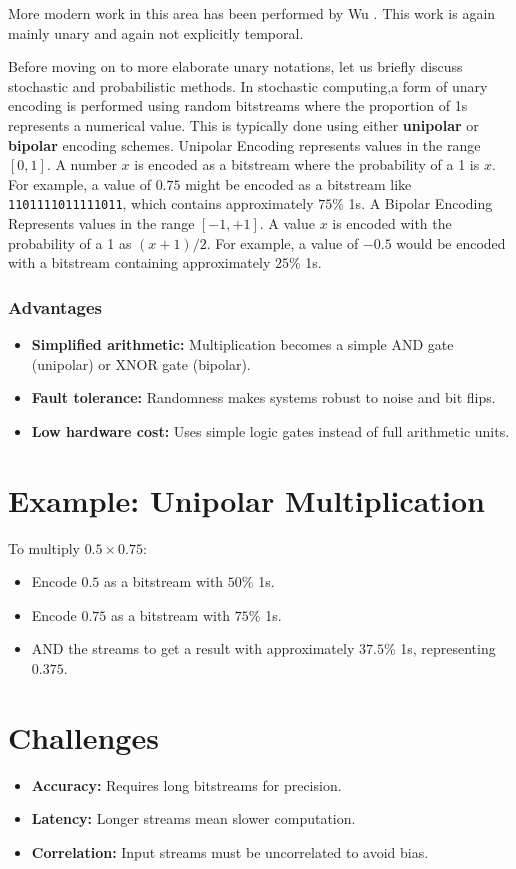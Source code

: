\documentclass{article}
\begin{document}
More modern work in this area has been performed by Wu \cite{wu2020ugemm} \cite{pan2022t} \cite{wu2022usystolic}. This work is again mainly unary and again not explicitly temporal.

Before moving on to more elaborate unary notations, let us briefly discuss stochastic and probabilistic methods. In stochastic computing,a form of unary encoding is performed using random bitstreams where the proportion of 1s represents a numerical value. This is typically done using either \textbf{unipolar} or \textbf{bipolar} encoding schemes.
Unipolar Encoding represents values in the range $[0, 1]$. A number $x$ is encoded as a bitstream where the probability of a 1 is $x$. For example, a value of $0.75$ might be encoded as a bitstream like \texttt{1101111011111011}, which contains approximately $75\%$ 1s. A Bipolar Encoding Represents values in the range $[-1, +1]$. A value $x$ is encoded with the probability of a 1 as $(x + 1)/2$. For example, a value of $-0.5$ would be encoded with a bitstream containing approximately $25\%$ 1s.

\subsubsection{Advantages}
\begin{itemize}
  \item \textbf{Simplified arithmetic:} Multiplication becomes a simple AND gate (unipolar) or XNOR gate (bipolar).
  \item \textbf{Fault tolerance:} Randomness makes systems robust to noise and bit flips.
  \item \textbf{Low hardware cost:} Uses simple logic gates instead of full arithmetic units.
\end{itemize}

\section{Example: Unipolar Multiplication}
To multiply $0.5 \times 0.75$:
\begin{itemize}
  \item Encode $0.5$ as a bitstream with $50\%$ 1s.
  \item Encode $0.75$ as a bitstream with $75\%$ 1s.
  \item AND the streams to get a result with approximately $37.5\%$ 1s, representing $0.375$.
\end{itemize}

\section{Challenges}
\begin{itemize}
  \item \textbf{Accuracy:} Requires long bitstreams for precision.
  \item \textbf{Latency:} Longer streams mean slower computation.
  \item \textbf{Correlation:} Input streams must be uncorrelated to avoid bias.
\end{itemize}
\end{document}
